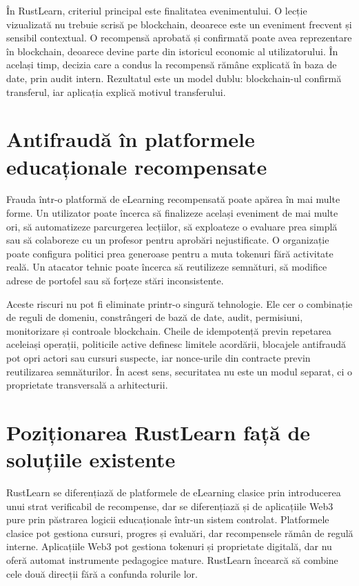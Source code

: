 În RustLearn, criteriul principal este finalitatea evenimentului. O lecție vizualizată nu trebuie scrisă pe blockchain, deoarece este un eveniment frecvent și sensibil contextual. O recompensă aprobată și confirmată poate avea reprezentare în blockchain, deoarece devine parte din istoricul economic al utilizatorului. În același timp, decizia care a condus la recompensă rămâne explicată în baza de date, prin audit intern. Rezultatul este un model dublu: blockchain-ul confirmă transferul, iar aplicația explică motivul transferului.

\section{Antifraudă în platformele educaționale recompensate}
Frauda într-o platformă de eLearning recompensată poate apărea în mai multe forme. Un utilizator poate încerca să finalizeze același eveniment de mai multe ori, să automatizeze parcurgerea lecțiilor, să exploateze o evaluare prea simplă sau să colaboreze cu un profesor pentru aprobări nejustificate. O organizație poate configura politici prea generoase pentru a muta tokenuri fără activitate reală. Un atacator tehnic poate încerca să reutilizeze semnături, să modifice adrese de portofel sau să forțeze stări inconsistente.

Aceste riscuri nu pot fi eliminate printr-o singură tehnologie. Ele cer o combinație de reguli de domeniu, constrângeri de bază de date, audit, permisiuni, monitorizare și controale blockchain. Cheile de idempotență previn repetarea aceleiași operații, politicile active definesc limitele acordării, blocajele antifraudă pot opri actori sau cursuri suspecte, iar nonce-urile din contracte previn reutilizarea semnăturilor. În acest sens, securitatea nu este un modul separat, ci o proprietate transversală a arhitecturii.

\section{Poziționarea RustLearn față de soluțiile existente}
RustLearn se diferențiază de platformele de eLearning clasice prin introducerea unui strat verificabil de recompense, dar se diferențiază și de aplicațiile Web3 pure prin păstrarea logicii educaționale într-un sistem controlat. Platformele clasice pot gestiona cursuri, progres și evaluări, dar recompensele rămân de regulă interne. Aplicațiile Web3 pot gestiona tokenuri și proprietate digitală, dar nu oferă automat instrumente pedagogice mature. RustLearn încearcă să combine cele două direcții fără a confunda rolurile lor.

